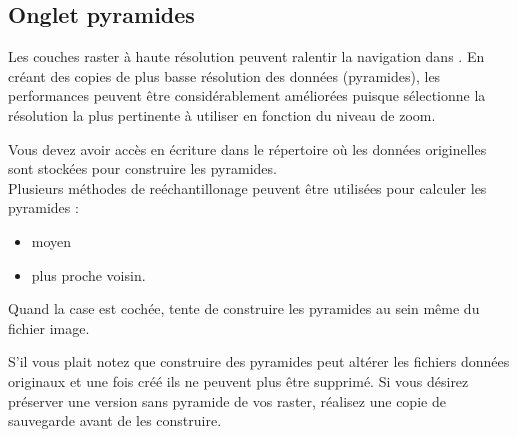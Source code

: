 \subsection{Onglet pyramides}\label{raster_pyramids}

Les couches raster à haute résolution peuvent ralentir la navigation dans \qg. En créant des copies de plus basse résolution des données (pyramides), les performances peuvent être considérablement améliorées puisque \qg sélectionne la résolution la plus pertinente à utiliser en fonction du niveau de zoom.


Vous devez avoir accès en écriture dans le répertoire où les données
originelles sont stockées pour construire les pyramides. \\
Plusieurs méthodes de reéchantillonage peuvent être utilisées pour calculer les pyramides :
\begin{itemize}[label=--]
\item moyen
\item plus proche voisin.
\end{itemize}

Quand la case  est cochée, \qg tente de construire les pyramides au sein même du fichier image.

S'il vous plait notez que construire des pyramides peut altérer les fichiers
données originaux et une fois créé ils ne peuvent plus être supprimé. Si vous désirez préserver une version sans pyramide de vos raster, réalisez une copie de sauvegarde avant de les construire.

